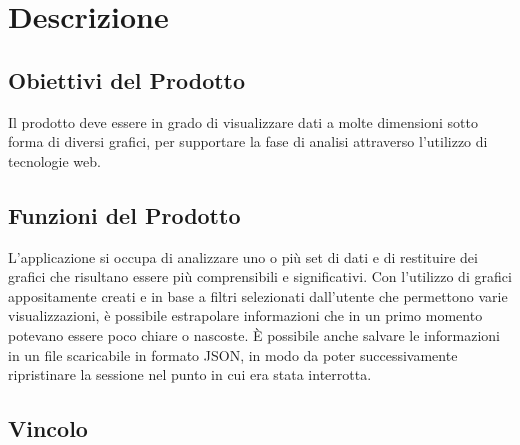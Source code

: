 \chapter{Descrizione}

\section{Obiettivi del Prodotto}
Il prodotto deve essere in grado di visualizzare dati a molte dimensioni sotto forma di diversi grafici, per supportare la fase di analisi attraverso l'utilizzo di tecnologie web.

\section{Funzioni del Prodotto}
L'applicazione si occupa di analizzare uno o più set di dati e di restituire dei grafici che risultano essere più comprensibili e significativi.
Con l'utilizzo di grafici appositamente creati e in base a filtri selezionati dall'utente che permettono varie visualizzazioni, è possibile estrapolare informazioni che in un primo momento potevano essere poco chiare o nascoste.
È possibile anche salvare le informazioni in un file scaricabile in formato JSON, in modo da poter successivamente ripristinare la sessione nel punto in cui era stata interrotta.

\section{Vincolo}

